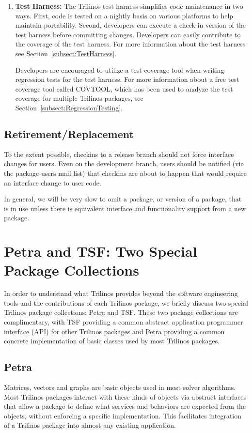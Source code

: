 \documentclass[12pt,relax]{TrilinosDevGuide}
\begin{document}
\begin{enumerate}
\item {\bf Test Harness:} 
The Trilinos test harness simplifies code maintenance in two ways.  First, code 
is tested on a nightly basis on various platforms to help maintain portability.
Second, developers can execute a check-in version of the test harness before 
committing changes.  Developers can easily contribute to the coverage of the 
test harness.  For more information about the test harness see 
Section~\ref{subsect:TestHarness}.

Developers are encouraged to utilize a test coverage tool when writing  
regression tests for the test harness.  For more information about a free test 
coverage tool called COVTOOL, which has been used to analyze the test coverage 
for multiple Trilinos packages, see Section~\ref{subsect:RegressionTesting}.
\end{enumerate}


\subsection{Retirement/Replacement}
To the extent possible, checkins to a release branch should not force 
interface changes for users.  Even on the development branch, users should be 
notified (via the package-users mail list) that checkins are about to happen 
that would require an interface change to user code.

In general, we will be very slow to omit a package, or version of a package, 
that is in use unless there is equivalent interface and functionality support 
from a new package.

\section{Petra and TSF: Two Special Package Collections}
\label{Section:EpetraAndTSF}
In order to understand what Trilinos provides beyond the software
engineering tools and the
contributions of each Trilinos package, we briefly discuss two special
Trilinos package collections: Petra and TSF.  These two package
collections are complimentary,
with TSF providing a common abstract application
programmer interface (API) for other Trilinos packages and Petra
providing a common concrete implementation of basic classes used by most
Trilinos packages.

\subsection{Petra}
Matrices, vectors and graphs are basic objects used in most solver
algorithms. Most Trilinos
packages interact with these kinds of objects via abstract interfaces that
allow a package to define what services and behaviors are expected from the objects,
without enforcing a specific implementation.   This facilitates
integration of a Trilinos package into almost any existing
application.
\end{document}
